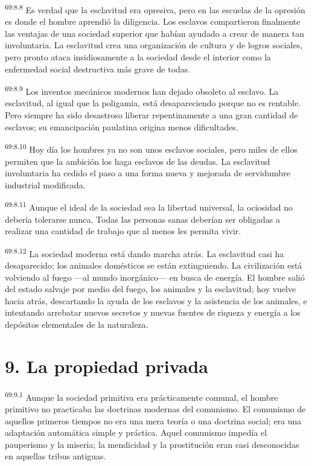 \documentclass[twoside, 11pt]{book}
\begin{document}
\par
\textsuperscript{69:8.8} Es verdad que la esclavitud era opresiva, pero en las escuelas de la opresión es donde el hombre aprendió la diligencia. Los esclavos compartieron finalmente las ventajas de una sociedad superior que habían ayudado a crear de manera tan involuntaria. La esclavitud crea una organización de cultura y de logros sociales, pero pronto ataca insidiosamente a la sociedad desde el interior como la enfermedad social destructiva más grave de todas.

\par
\textsuperscript{69:8.9} Los inventos mecánicos modernos han dejado obsoleto al esclavo. La esclavitud, al igual que la poligamia, está desapareciendo porque no es rentable. Pero siempre ha sido desastroso liberar repentinamente a una gran cantidad de esclavos; su emancipación paulatina origina menos dificultades.

\par
\textsuperscript{69:8.10} Hoy día los hombres ya no son unos esclavos sociales, pero miles de ellos permiten que la ambición los haga esclavos de las deudas. La esclavitud involuntaria ha cedido el paso a una forma nueva y mejorada de servidumbre industrial modificada.

\par
\textsuperscript{69:8.11} Aunque el ideal de la sociedad sea la libertad universal, la ociosidad no debería tolerarse nunca. Todas las personas sanas deberían ser obligadas a realizar una cantidad de trabajo que al menos les permita vivir.

\par
\textsuperscript{69:8.12} La sociedad moderna está dando marcha atrás. La esclavitud casi ha desaparecido; los animales domésticos se están extinguiendo. La civilización está volviendo al fuego ---al mundo inorgánico--- en busca de energía. El hombre salió del estado salvaje por medio del fuego, los animales y la esclavitud; hoy vuelve hacia atrás, descartando la ayuda de los esclavos y la asistencia de los animales, e intentando arrebatar nuevos secretos y nuevas fuentes de riqueza y energía a los depósitos elementales de la naturaleza.

\section*{9. La propiedad privada}
\par
\textsuperscript{69:9.1} Aunque la sociedad primitiva era prácticamente comunal, el hombre primitivo no practicaba las doctrinas modernas del comunismo. El comunismo de aquellos primeros tiempos no era una mera teoría o una doctrina social; era una adaptación automática simple y práctica. Aquel comunismo impedía el pauperismo y la miseria; la mendicidad y la prostitución eran casi desconocidas en aquellas tribus antiguas.
\end{document}
